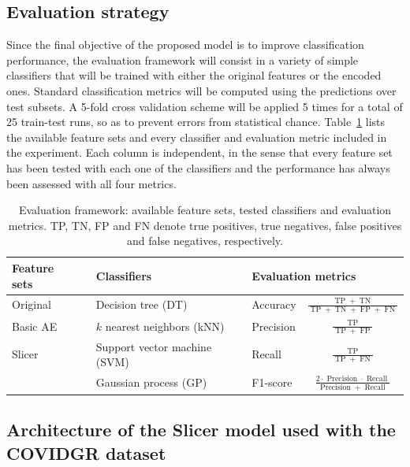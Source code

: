 \documentclass[
	fontsize=11pt, %
	twoside=false, %
	open=any, %
	secnumdepth=1, %
]{kaobook}
\newcommand{\TP}{\operatorname{TP}}
\newcommand{\TN}{\operatorname{TN}}
\newcommand{\FP}{\operatorname{FP}}
\newcommand{\FN}{\operatorname{FN}}
\begin{document}
\subsection{Evaluation strategy}

Since the final objective of the proposed model is to improve classification performance, the evaluation framework will consist in a variety of simple classifiers that will be trained with either the original features or the encoded ones. Standard classification metrics will be computed using the predictions over test subsets. A 5-fold cross validation scheme will be applied 5 times for a total of 25 train-test runs, so as to prevent errors from statistical chance. Table~\ref{tab:eval} lists the available feature sets and every classifier and evaluation metric included in the experiment. Each column is independent, in the sense that every feature set has been tested with each one of the classifiers and the performance has always been assessed with all four metrics.

\begin{table}[htbp]
    \centering
    \begin{tabular}{lllc}
    \toprule
         \bfseries Feature sets~~ &\bfseries Classifiers &  \multicolumn{2}{l}{\bfseries Evaluation metrics} \\\midrule
         Original&Decision tree (DT) & Accuracy& \(\displaystyle\frac{\TP+\TN}{\TP+\TN+\FP+\FN}\) \\
\addlinespace
         Basic AE&$k$ nearest neighbors (kNN) & Precision& \(\displaystyle\frac{\TP}{\TP+\FP}\) \\
\addlinespace
         Slicer&Support vector machine (SVM)~~ & Recall& \(\displaystyle\frac{\TP}{\TP+\FN}\) \\
\addlinespace
         &Gaussian process (GP) & F1-score& \(\displaystyle\frac{2\cdot\operatorname{Precision}\cdot\operatorname{Recall}}{\operatorname{Precision}+\operatorname{Recall}}\) \\
     \bottomrule
    \end{tabular}
    \caption{Evaluation framework: available feature sets, tested classifiers and evaluation metrics. TP, TN, FP and FN denote true positives, true negatives, false positives and false negatives, respectively.}
    \label{tab:eval}
\end{table}
\vspace{-1em} 

\subsection{Architecture of the Slicer model used with the COVIDGR dataset}
\end{document}
